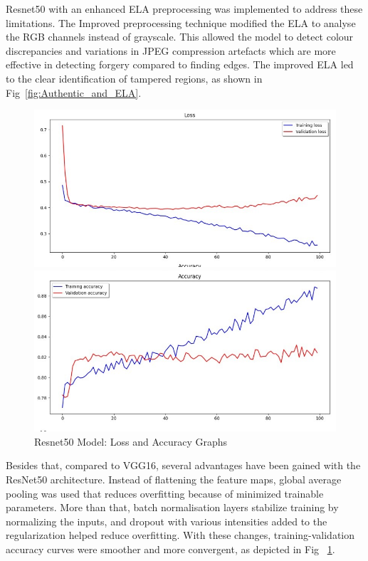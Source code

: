 \documentclass{ieeeaccess}
\begin{document}
  Resnet50 with an enhanced ELA preprocessing was implemented to address these limitations. The Improved preprocessing technique modified the ELA to analyse the RGB channels instead of grayscale. This allowed the model to detect colour discrepancies and variations in JPEG compression artefacts which are more effective in detecting forgery compared to finding edges.
  The improved ELA led to the clear identification of tampered regions, as shown in Fig~\ref{fig:Authentic_and_ELA}.
  
  \begin{figure}[h!]
  	\centering
  	\begin{minipage}{0.45\textwidth}
  		\centering
  		\includegraphics[width=\linewidth]{Graph_LOSS.jpg}
  	\end{minipage}
  	\hfill
  	\begin{minipage}{0.45\textwidth}
  		\centering
  		\includegraphics[width=\linewidth]{Graph_ACC.jpg}
  		
  	\end{minipage}
  	\caption{Resnet50 Model: Loss and Accuracy Graphs}
  	\label{fig:Resnet50 Loss and Accuracy Graphs}
  \end{figure}
  Besides that, compared to VGG16, several advantages have been gained with the ResNet50 architecture. Instead of flattening the feature maps, global average pooling was used that reduces overfitting because of minimized trainable parameters. More than that, batch normalisation layers stabilize training by normalizing the inputs, and dropout with various intensities added to the regularization helped reduce overfitting. With these changes, training-validation accuracy curves were smoother and more convergent, as depicted in Fig ~\ref{fig:Resnet50 Loss and Accuracy Graphs}.
 
\end{document}
